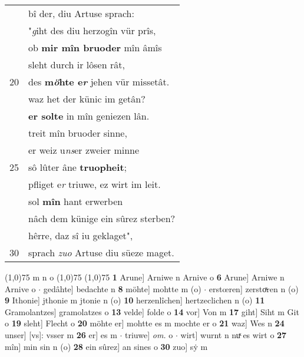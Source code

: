 \documentclass[8pt,a4paper,notitlepage]{article}
\begin{document}
\begin{table}[ht]
\begin{minipage}[t]{0.5\linewidth}
\begin{tabular}{rl}
 & bî der, diu  Artuse sprach:\\ 
 & "\textit{g}iht des diu herzogîn vür prîs,\\ 
 & ob \textbf{mir mîn bruoder} mîn âmîs\\ 
 & sleht durch ir lôsen rât,\\ 
20 & des \textbf{m\textit{ö}hte e\textit{r}} jehen vür missetât.\\ 
 & waz het der künic im getân?\\ 
 & \textbf{er solte} in mîn geniezen lân.\\ 
 & treit mîn bruoder sinne,\\ 
 & er weiz u\textit{ns}er zweier minne\\ 
25 & sô lûter âne \textbf{truopheit};\\ 
 & pfliget e\textit{r} triuwe, ez wirt im leit.\\ 
 & sol \textbf{mîn} hant erwerben\\ 
 & nâch dem künige ein sûrez sterben?\\ 
 & hêrre, daz sî iu geklaget",\\ 
30 & sprach \textit{zuo} Artuse diu süeze maget.\\ 
\end{tabular}
\scriptsize
\line(1,0){75} \newline
m n o \newline
\line(1,0){75} \newline
\newline
\line(1,0){75} \newline
\textbf{1} Arune] Arniwe n Arnive o \textbf{6} Arune] Arniwe n Arnive o  $\cdot$ gedâhte] bedachte n \textbf{8} möhte] mohtte m (o)  $\cdot$ erstœren] zerstoͯren n (o) \textbf{9} Ithonie] jthonie m jtonie n (o) \textbf{10} herzenlîchen] hertzeclichen n (o) \textbf{11} Gramolantzes] gramolatzes o \textbf{13} velde] folde o \textbf{14} vor] Von m \textbf{17} giht] Siht m Git o \textbf{19} sleht] Flecht o \textbf{20} möhte er] mohtte es m mochte er o \textbf{21} waz] Wes n \textbf{24} unser] [vs]: vsser m \textbf{26} er] es m  $\cdot$ triuwe] \textit{om.} o  $\cdot$ wirt] wurnt n nuͯ es wirt o \textbf{27} mîn] min sin n (o) \textbf{28} ein sûrez] an sines o \textbf{30} zuo] sẏ m \newline
\end{minipage}
\end{table}
\newpage
\end{document}
